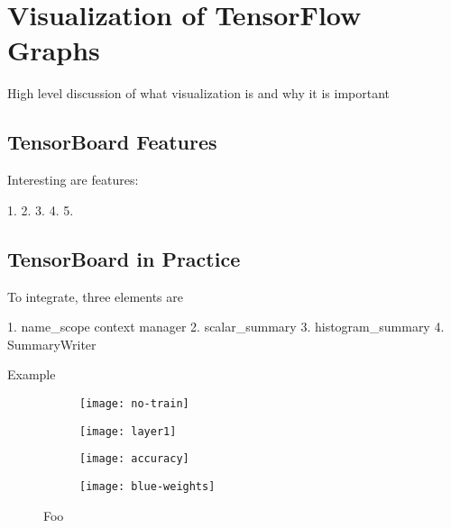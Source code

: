 \section{Visualization of TensorFlow Graphs}\label{sec:visual}

High level discussion of what visualization is and why it is important

\subsection{TensorBoard Features}\label{sec:visual-features}

Interesting are features:

1.
2.
3.
4.
5.

\subsection{TensorBoard in Practice}\label{sec:visual-code}

To integrate, three elements are

1. name_scope context manager
2. scalar_summary
3. histogram_summary
4. SummaryWriter

Example

\begin{figure}[h!]
  \centering
  \begin{subfigure}[h]{0.5\textwidth}
    \centering
    \texttt{[image: no-train]}
   \caption{}
   \label{fig:tensorboard-a}
  \end{subfigure}

  \vspace{0.3cm}

  \begin{subfigure}[h]{0.5\textwidth}
    \centering
    \texttt{[image: layer1]}
    \caption{}
    \label{fig:tensorboard-b}
  \end{subfigure}

  \vspace{0.3cm}

  \begin{subfigure}[h]{0.2\textwidth}
    \centering
    \texttt{[image: accuracy]}
    \caption{}
    \label{fig:tensorboard-c}
  \end{subfigure}
  \begin{subfigure}[h]{0.2\textwidth}
    \centering
    \texttt{[image: blue-weights]}
    \caption{}
    \label{fig:tensorboard-d}
  \end{subfigure}
  \caption{Foo}
  \label{fig:tensorboard}
\end{figure}

